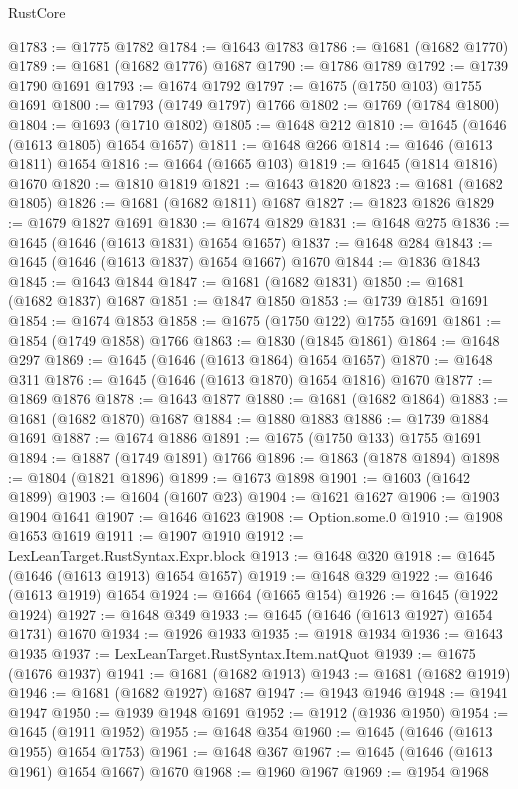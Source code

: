 \begin{lexlean}{RustCore}
\begin{coremodule}
@1783 := @1775 @1782
@1784 := @1643 @1783
@1786 := @1681 (@1682 @1770)
@1789 := @1681 (@1682 @1776) @1687
@1790 := @1786 @1789
@1792 := @1739 @1790 @1691
@1793 := @1674 @1792
@1797 := @1675 (@1750 @103) @1755 @1691
@1800 := @1793 (@1749 @1797) @1766
@1802 := @1769 (@1784 @1800)
@1804 := @1693 (@1710 @1802)
@1805 := @1648 @212
@1810 := @1645 (@1646 (@1613 @1805) @1654 @1657)
@1811 := @1648 @266
@1814 := @1646 (@1613 @1811) @1654
@1816 := @1664 (@1665 @103)
@1819 := @1645 (@1814 @1816) @1670
@1820 := @1810 @1819
@1821 := @1643 @1820
@1823 := @1681 (@1682 @1805)
@1826 := @1681 (@1682 @1811) @1687
@1827 := @1823 @1826
@1829 := @1679 @1827 @1691
@1830 := @1674 @1829
@1831 := @1648 @275
@1836 := @1645 (@1646 (@1613 @1831) @1654 @1657)
@1837 := @1648 @284
@1843 := @1645 (@1646 (@1613 @1837) @1654 @1667) @1670
@1844 := @1836 @1843
@1845 := @1643 @1844
@1847 := @1681 (@1682 @1831)
@1850 := @1681 (@1682 @1837) @1687
@1851 := @1847 @1850
@1853 := @1739 @1851 @1691
@1854 := @1674 @1853
@1858 := @1675 (@1750 @122) @1755 @1691
@1861 := @1854 (@1749 @1858) @1766
@1863 := @1830 (@1845 @1861)
@1864 := @1648 @297
@1869 := @1645 (@1646 (@1613 @1864) @1654 @1657)
@1870 := @1648 @311
@1876 := @1645 (@1646 (@1613 @1870) @1654 @1816) @1670
@1877 := @1869 @1876
@1878 := @1643 @1877
@1880 := @1681 (@1682 @1864)
@1883 := @1681 (@1682 @1870) @1687
@1884 := @1880 @1883
@1886 := @1739 @1884 @1691
@1887 := @1674 @1886
@1891 := @1675 (@1750 @133) @1755 @1691
@1894 := @1887 (@1749 @1891) @1766
@1896 := @1863 (@1878 @1894)
@1898 := @1804 (@1821 @1896)
@1899 := @1673 @1898
@1901 := @1603 (@1642 @1899)
@1903 := @1604 (@1607 @23)
@1904 := @1621 @1627
@1906 := @1903 @1904 @1641
@1907 := @1646 @1623
@1908 := Option.some.{0}
@1910 := @1908 @1653 @1619
@1911 := @1907 @1910
@1912 := LexLeanTarget.RustSyntax.Expr.block
@1913 := @1648 @320
@1918 := @1645 (@1646 (@1613 @1913) @1654 @1657)
@1919 := @1648 @329
@1922 := @1646 (@1613 @1919) @1654
@1924 := @1664 (@1665 @154)
@1926 := @1645 (@1922 @1924)
@1927 := @1648 @349
@1933 := @1645 (@1646 (@1613 @1927) @1654 @1731) @1670
@1934 := @1926 @1933
@1935 := @1918 @1934
@1936 := @1643 @1935
@1937 := LexLeanTarget.RustSyntax.Item.natQuot
@1939 := @1675 (@1676 @1937)
@1941 := @1681 (@1682 @1913)
@1943 := @1681 (@1682 @1919)
@1946 := @1681 (@1682 @1927) @1687
@1947 := @1943 @1946
@1948 := @1941 @1947
@1950 := @1939 @1948 @1691
@1952 := @1912 (@1936 @1950)
@1954 := @1645 (@1911 @1952)
@1955 := @1648 @354
@1960 := @1645 (@1646 (@1613 @1955) @1654 @1753)
@1961 := @1648 @367
@1967 := @1645 (@1646 (@1613 @1961) @1654 @1667) @1670
@1968 := @1960 @1967
@1969 := @1954 @1968

\end{coremodule}
\end{lexlean}
